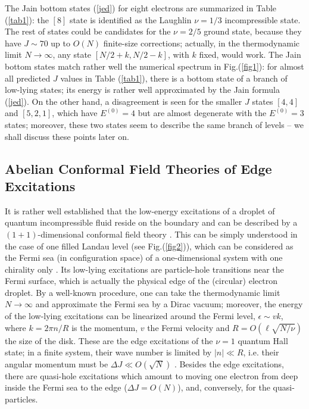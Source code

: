 The Jain bottom states (\ref{jed}) for eight electrons
are summarized in Table (\ref{tab1}):
the $[8]$ state is identified as the Laughlin $\nu=1/3$ incompressible
state. The rest of states could be candidates for the $\nu=2/5$
ground state, because they have $J\sim 70$ up to $O(N)$ finite-size
corrections; actually, in the thermodynamic limit $N\to\infty$, 
any state $[N/2 + k, N/2 -k ]$, with $k$ fixed, would work.
The Jain bottom states match rather well the numerical spectrum
in Fig.(\ref{fig1}): 
for almost all predicted $J$ values in Table (\ref{tab1}), there is
a bottom state of a branch of low-lying states;
its energy is rather well approximated by the Jain formula (\ref{jed}). 
On the other hand, a disagreement is seen 
for the smaller $J$ states $[4,4]$ and $[5,2,1]$, which have
$E^{(0)}=4$ but are almost degenerate with the $E^{(0)}=3$ states;
moreover, these two states seem to describe the same branch of levels --
we shall discuss these points later on.

 

\subsection{Abelian Conformal Field Theories of Edge Excitations}

It is rather well established that the low-energy excitations of a 
droplet of quantum incompressible fluid reside on the
boundary and can be described by a $(1+1)$-dimensional conformal
field theory \cite{wen}.
This can be simply understood in the case of one
filled Landau level (see Fig.(\ref{fig2})), which can be considered
as the Fermi sea (in configuration space) of a one-dimensional system with one 
chirality only \cite{stone}. 
Its low-lying excitations are particle-hole 
transitions near the Fermi surface, which is actually the physical edge of 
the (circular) electron droplet. 
By a well-known procedure, one can take the thermodynamic
limit $N\to\infty$ and approximate the Fermi sea by a Dirac vacuum;
moreover, the energy of the low-lying excitations can be linearized
around the Fermi level, 
$\epsilon\sim v k$, where $k= 2\pi n/R$ is the momentum,
$v$ the Fermi velocity and $R=O(\ell\sqrt{N/\nu})$ the size of the disk.
These are the edge excitations of the $\nu=1$ quantum Hall state;
in a finite system, their wave number is limited by $\vert n\vert \ll R$,
i.e. their angular momentum must be $\Delta J \ll O(\sqrt{N})$
\cite{cdtz1}. Besides the edge excitations,
there are quasi-hole excitations which amount to
moving one electron from deep inside the Fermi sea to the edge
($\Delta J =O(N)$), and, conversely, for the quasi-particles.

